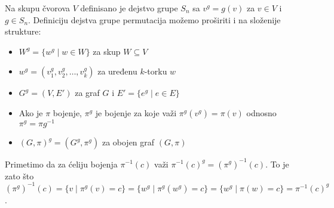 \documentclass[12pt,oneside]{memoir}
\theoremstyle{definition}
\begin{document}
   Na skupu čvorova $V$ definisano je dejstvo grupe $S_n$ sa $v^g = g(v)$ za $v
   \in V$ i $g \in S_n$.  Definiciju dejstva grupe permutacija možemo proširiti
   i na složenije strukture:
   \begin{itemize}
       \item $W^g = \{w^g \mid w \in W\}$ za skup $W \subseteq V$
       \item $w^g = (v_1^g, v_2^g, \dots, v_k^g)$ za uređenu $k$-torku $w$
       \item $G^g = (V, E')$ za graf $G$ i $E' = \{e^g \mid e \in E\}$
       \item Ako je $\pi$ bojenje, $\pi^g$ je bojenje za koje važi
		   $\pi^g(v^g)=\pi(v)$ odnosno $\pi^g=\pi g^{-1}$
       \item $(G, \pi)^g = (G^g, \pi^g)$ za obojen graf $(G, \pi)$
   \end{itemize}
   Primetimo da za ćeliju bojenja $\pi^{-1}(c)$ važi $\pi^{-1}(c)^g =
   (\pi^g)^{-1}(c)$. To je zato što $(\pi^g)^{-1}(c) = \{v \mid \pi^g(v) = c\}
   = \{w^g \mid \pi^g(w^g) = c\} = \{w^g \mid \pi(w) = c\} = \pi^{-1}(c)^g$. 
\end{document}
